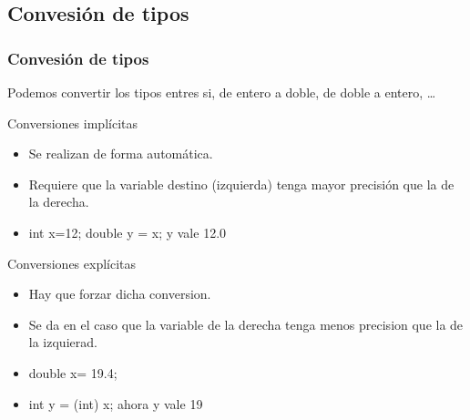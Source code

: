 \documentclass{beamer}
\begin{document}
\subsection{Convesión de tipos}
\begin{frame}
    \frametitle{Convesión de tipos}
Podemos convertir los tipos entres si, de entero a doble, de doble a entero, \dots

        \pause
	\begin{block}{Conversiones implícitas}
	\begin{itemize}[<+-|alert@+>]
		\item Se realizan de forma automática.
		\item Requiere que la variable destino (izquierda) tenga mayor precisión que la de la derecha.
		\item int x=12; double y = x; y vale 12.0
	\end{itemize}
	\end{block}
	\pause
	\begin{block}{Conversiones explícitas}
	\begin{itemize}[<+-|alert@+>]
	\item Hay que forzar dicha conversion.
	\item Se da en el caso que la variable de la derecha tenga menos precision que la de la izquierad.
	\item double x= 19.4;
	\item int y = (int) x; ahora y vale 19
\end{itemize}
	\end{block}
\end{frame}
\end{document}
